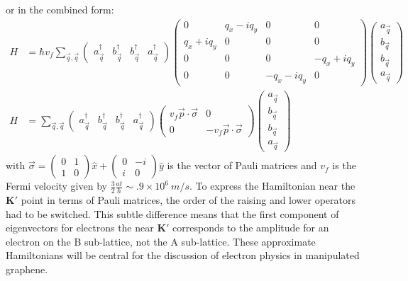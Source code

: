 or in the combined form:
\begin{align}
	H&=\hbar v_f \sum_{\vec q, \vec{q}}
		\left( \begin{array}{cccc}  a^{\dagger}_{\vec{q}} & b^{\dagger}_{\vec{q}}&  b^{\dagger}_{\vec{q}} & a^{\dagger}_{\vec{q}}
																							\end{array} \right)
		\left( \begin{array}{cccc}
			0              & q_x - i q_y & 0            & 0 \\
			q_x+i q_y      & 0           & 0            & 0 \\                            
			0              & 0           & 0            & -q_x+i q_y \\
			0              & 0           & -q_x-i q_y & 0			            			\end{array} \right)
		\left( \begin{array}{c }  a_{\vec{q}} \\ b_{\vec{q}} \\  b_{\vec{q}} \\ a_{\vec{q}} \end{array} \right) \\
	H&=\sum_{\vec q, \vec{q}}
		\left( \begin{array}{cccc}  a^{\dagger}_{\vec{q}} & b^{\dagger}_{\vec{q}}&  b^{\dagger}_{\vec{q}} & a^{\dagger}_{\vec{q}}
																							\end{array} \right)
		\left( \begin{array}{cc}
			v_f \vec{p} \cdot \vec{\sigma}              & 0\\
			0              & -v_f \vec{p} \cdot \vec{\sigma}			   	            			\end{array} \right)
		\left( \begin{array}{c }  a_{\vec{q}} \\ b_{\vec{q}} \\  b_{\vec{q}} \\ a_{\vec{q}} \end{array} \right)
	\label{eq:TB:FullH}
\end{align}
with $\vec{\sigma}= \left( \begin{array}{cc} 0 & 1 \\ 1 & 0 \end{array} \right) \hat{x}+\left( \begin{array}{cc} 0 & -i \\ i & 0 \end{array} \right) \hat{y}$ is the vector of Pauli matrices and $v_f$ is the Fermi velocity given by $\frac{3}{2}\frac{at}{\hbar} \sim .9 \times 10^6 \ m/s$.
To express the Hamiltonian near the $\bm{K'}$ point in terms of Pauli matrices, the order of the raising and lower operators had to be switched.
This subtle difference means that the first component of eigenvectors for electrons the near $\bm{K'}$ corresponds to the amplitude for an electron on the B sub-lattice, not the A sub-lattice.
These approximate Hamiltonians will be central for the discussion of electron physics in manipulated graphene.

